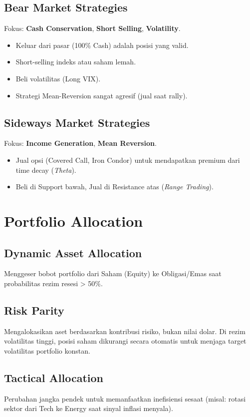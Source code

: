 \documentclass[12pt,a4paper]{book}
\begin{document}
\subsection{Bear Market Strategies}
Fokus: \textbf{Cash Conservation}, \textbf{Short Selling}, \textbf{Volatility}.
\begin{itemize}
    \item Keluar dari pasar (100\% Cash) adalah posisi yang valid.
    \item Short-selling indeks atau saham lemah.
    \item Beli volatilitas (Long VIX).
    \item Strategi Mean-Reversion sangat agresif (jual saat rally).
\end{itemize}

\subsection{Sideways Market Strategies}
Fokus: \textbf{Income Generation}, \textbf{Mean Reversion}.
\begin{itemize}
    \item Jual opsi (Covered Call, Iron Condor) untuk mendapatkan premium dari time decay (\textit{Theta}).
    \item Beli di Support bawah, Jual di Resistance atas (\textit{Range Trading}).
\end{itemize}

\section{Portfolio Allocation}
\subsection{Dynamic Asset Allocation}
Menggeser bobot portfolio dari Saham (Equity) ke Obligasi/Emas saat probabilitas rezim resesi > 50\%.

\subsection{Risk Parity}
Mengalokasikan aset berdasarkan kontribusi risiko, bukan nilai dolar. Di rezim volatilitas tinggi, posisi saham dikurangi secara otomatis untuk menjaga target volatilitas portfolio konstan.

\subsection{Tactical Allocation}
Perubahan jangka pendek untuk memanfaatkan inefisiensi sesaat (misal: rotasi sektor dari Tech ke Energy saat sinyal inflasi menyala).
\end{document}
